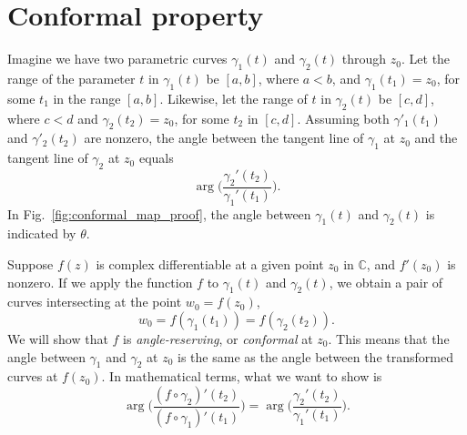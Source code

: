 \section{Conformal property} \label{sec:confomal}


Imagine we have two parametric curves $\gamma_1(t)$ and $\gamma_2(t)$ through $z_0$. Let the range of the parameter $t$ in $\gamma_1(t)$ be $[a,b]$, where $a<b$, and $\gamma_1(t_1) = z_0$, for some $t_1$ in the range $[a,b]$.  Likewise, let the range of $t$ in $\gamma_2(t)$ be $[c,d]$, where $c<d$ and $\gamma_2(t_2) = z_0$, for some $t_2$ in $[c,d]$. Assuming both $\gamma'_1(t_1)$ and $\gamma'_2(t_2)$ are nonzero, the angle between the 
tangent line of $\gamma_1$ at $z_0$ and the tangent line of $\gamma_2$ at $z_0$ equals
$$ \arg\Big(\frac{\gamma_2'(t_2)}{\gamma_1'(t_1)}\Big).
$$
In Fig.~\ref{fig:conformal_map_proof}, the angle between $\gamma_1(t)$ and $\gamma_2(t)$ is indicated by $\theta$.


Suppose $f(z)$ is complex differentiable at a given point $z_0$ in $\mathbb{C}$, and $f'(z_0)$ is nonzero. If we apply the function $f$ to $\gamma_1(t)$ and $\gamma_2(t)$, we obtain a pair of curves intersecting at the point $w_0 = f(z_0)$,
$$
w_0 = f(\gamma_1(t_1)) = f(\gamma_2(t_2)).
$$
We will show that $f$ is  {\em angle-reserving}, or {\em conformal} at $z_0$. This means that the angle between $\gamma_1$ and $\gamma_2$ at $z_0$ is the same as the angle between the transformed curves at $f(z_0)$. In mathematical terms, what we want to show is
$$
\arg\Big( \frac{(f \circ\gamma_2)'(t_2)}{(f\circ \gamma_1)'(t_1)} \Big)
 = \arg\Big(\frac{\gamma_2'(t_2)}{\gamma_1'(t_1)}\Big).
$$



